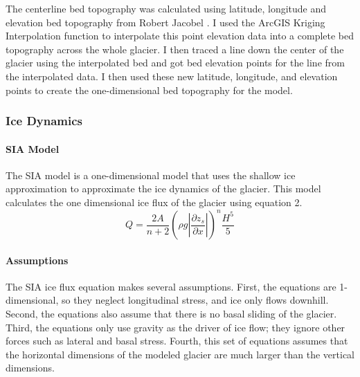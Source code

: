 \documentclass{article}
\begin{document}
The centerline bed topography was calculated using latitude, longitude and elevation bed topography from Robert Jacobel \cite{ref4}. 
I used the ArcGIS Kriging Interpolation function \cite{ref5} to interpolate this point elevation data into a complete 
bed topography across the whole glacier. I then traced a line down the center of the glacier using the interpolated bed and got bed elevation points for the line 
from the interpolated data. I then used these new latitude, longitude, and elevation points to create the one-dimensional bed topography for 
the model.

\subsubsection{Ice Dynamics}
\paragraph{SIA Model}
The SIA model is a one-dimensional model that uses the shallow ice approximation to approximate the ice dynamics of the glacier. This model 
calculates the one dimensional ice flux of the glacier using equation 2. 
\begin{equation}Q=\frac{2A}{n+2}(\rho g|\frac{\partial z_s}{\partial x}|)^n\frac{H^5}{5}\end{equation}

\paragraph{Assumptions}
The SIA ice flux equation makes several assumptions. First, the equations are 1-dimensional, so they neglect longitudinal stress, and ice only 
flows downhill. Second, the equations also assume that there is no basal sliding of the glacier. Third, the equations only use gravity as the 
driver of ice flow; they ignore other forces such as lateral and basal stress. Fourth, this set of equations assumes that the horizontal 
dimensions of the modeled glacier are much larger than the vertical dimensions.
\end{document}
